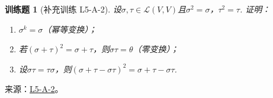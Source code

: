 \documentclass[12pt,fontset=fandol]{ctexart}
\newtheorem{exercise}{训练题}[section]
\begin{document}
\begin{exercise}[补充训练 L5-A-2]\label{prob:L5-A-2}
设$\sigma,\tau \in \mathcal{L}(V,V)$且$\sigma^2=\sigma$，$\tau^2=\tau$. 证明：
        \begin{enumerate}
            \item $\sigma^k=\sigma$（幂等变换）；

            \item 若$(\sigma+\tau)^2=\sigma+\tau$，则$\sigma\tau=\theta$（零变换）；

            \item 设$\sigma\tau=\tau\sigma$，则$(\sigma+\tau-\sigma\tau)^2=\sigma+\tau-\sigma\tau$.
        \end{enumerate}
\end{exercise}
\noindent 来源：\href{https://github.com/yhwu-is/Linear-Algebra-Left-Undone/blob/new/%E8%AE%B2%E4%B9%89/%E4%B8%93%E9%A2%98/5%20%E7%BA%BF%E6%80%A7%E6%98%A0%E5%B0%84.tex}{L5-A-2}。
\end{document}
